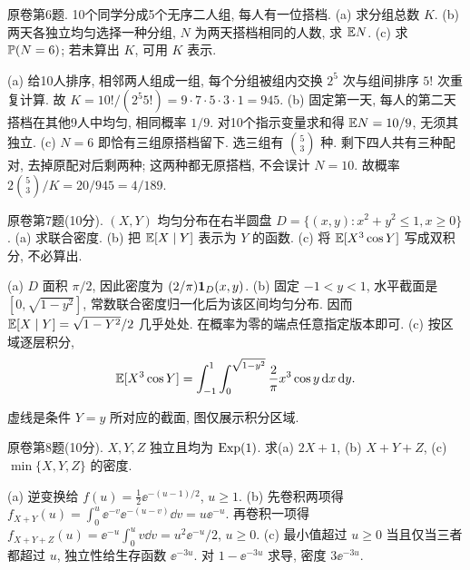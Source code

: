 \begin{exercise}\label{ex:fl17-6}
原卷第6题. 10个同学分成5个无序二人组, 每人有一位搭档. (a) 求分组总数 $K$. (b) 两天各独立均匀选择一种分组, $N$ 为两天搭档相同的人数, 求 $\mathbb E N$. (c) 求 $\mathbb P(N=6)$; 若未算出 $K$, 可用 $K$ 表示.
\end{exercise}
\begin{solution}
(a)\label{sol:fl17-6-a} 给10人排序, 相邻两人组成一组, 每个分组被组内交换 $2^5$ 次与组间排序 $5!$ 次重复计算. 故 $K=10!/(2^5 5!)=9\cdot7\cdot5\cdot3\cdot1=945$.
(b)\label{sol:fl17-6-b} 固定第一天, 每人的第二天搭档在其他9人中均匀, 相同概率 $1/9$. 对10个指示变量求和得 $\mathbb E N=10/9$, 无须其独立.
(c)\label{sol:fl17-6-c} $N=6$ 即恰有三组原搭档留下. 选三组有 $\binom53$ 种. 剩下四人共有三种配对, 去掉原配对后剩两种; 这两种都无原搭档, 不会误计 $N=10$. 故概率 $2\binom53/K=20/945=4/189$.
\end{solution}

\begin{exercise}\label{ex:fl17-7}
原卷第7题(10分). $(X,Y)$ 均匀分布在右半圆盘 $D=\{(x,y):x^2+y^2\leq1,x\geq0\}$. (a) 求联合密度. (b) 把 $\mathbb E[X\mid Y]$ 表示为 $Y$ 的函数. (c) 将 $\mathbb E[X^3\cos Y]$ 写成双积分, 不必算出.
\end{exercise}
\begin{solution}
(a)\label{sol:fl17-7-a} $D$ 面积 $\pi/2$, 因此密度为 $(2/\pi)\mathbf 1_D(x,y)$.
(b)\label{sol:fl17-7-b} 固定 $-1<y<1$, 水平截面是 $[0,\sqrt{1-y^2}]$, 常数联合密度归一化后为该区间均匀分布. 因而 $\mathbb E[X\mid Y]=\sqrt{1-Y^2}/2$ 几乎处处. 在概率为零的端点任意指定版本即可.
(c)\label{sol:fl17-7-c} 按区域逐层积分,
\[\mathbb E[X^3\cos Y]=\int_{-1}^1\int_0^{\sqrt{1-y^2}}\frac2\pi x^3\cos y\,\mathrm d x\,\mathrm d y.\]
\begin{center}\end{center}
虚线是条件 $Y=y$ 所对应的截面, 图仅展示积分区域.
\end{solution}

\begin{exercise}\label{ex:fl17-8}
原卷第8题(10分). $X,Y,Z$ 独立且均为 $\operatorname{Exp}(1)$. 求(a) $2X+1$, (b) $X+Y+Z$, (c) $\min\{X,Y,Z\}$ 的密度.
\end{exercise}
\begin{solution}
(a)\label{sol:fl17-8-a} 逆变换给 $f(u)=\tfrac12\ee^{-(u-1)/2}$, $u\geq1$.
(b)\label{sol:fl17-8-b} 先卷积两项得 $f_{X+Y}(u)=\int_0^u\ee^{-v}\ee^{-(u-v)}\dd v=u\ee^{-u}$. 再卷积一项得 $f_{X+Y+Z}(u)=\ee^{-u}\int_0^u v\dd v=u^2\ee^{-u}/2$, $u\geq0$.
(c)\label{sol:fl17-8-c} 最小值超过 $u\geq0$ 当且仅当三者都超过 $u$, 独立性给生存函数 $\ee^{-3u}$. 对 $1-\ee^{-3u}$ 求导, 密度 $3\ee^{-3u}$.
\end{solution}

